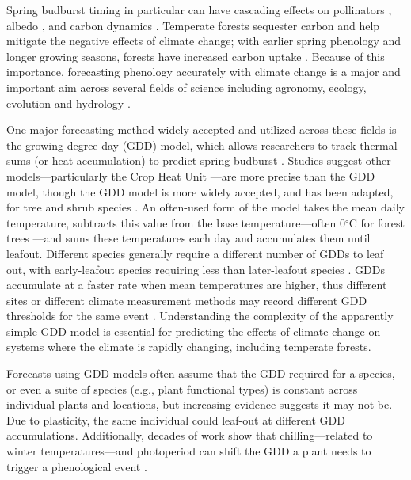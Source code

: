 \documentclass{article}\usepackage[]{graphicx}\usepackage[]{color}
\begin{document}
Spring budburst timing in particular can have cascading effects on pollinators \citep{Boggs2012, Pardee2017}, albedo \citep{Williamson2016}, and carbon dynamics \citep{Richardson2013}. Temperate forests sequester carbon and help mitigate the negative effects of climate change; with earlier spring phenology and longer growing seasons, forests have increased carbon uptake \citep{Keenan2014}. Because of this importance, forecasting phenology accurately with climate change is a major and important aim across several fields of science including agronomy, ecology, evolution and hydrology \citep{Moorcroft2001,Bolton2013,Yu2016,Taylor2020}. 
  
One major forecasting method widely accepted and utilized across these fields is the growing degree day (GDD) model, which allows researchers to track thermal sums (or heat accumulation) to predict spring budburst \citep{Schwartz2006,Vitasse2011,Cook2012,Phillimore2013,Crimmins2020}. Studies suggest other models---particularly the Crop Heat Unit \citep{Kumudini2014,Abendroth2019}---are more precise than the GDD model, though the GDD model is more widely accepted, and has been adapted, for tree and shrub species \citep{Yu2016,Klosterman2018,Montgomery2020}. An often-used form of the model takes the mean daily temperature, subtracts this value from the base temperature---often 0$^{\circ}$C for forest trees \citep[as estimates are proven to be more accurate,][]{Man2010}---and sums these temperatures each day and accumulates them until leafout. Different species generally require a different number of GDDs to leaf out, with early-leafout species requiring less than later-leafout species \citep{Fahey2016,Crimmins2020,Marquis2020}. GDDs accumulate at a faster rate when mean temperatures are higher, thus different sites or different climate measurement methods may record different GDD thresholds for the same event \citep{Bonhomme2000}. Understanding the complexity of the apparently simple GDD model is essential for predicting the effects of climate change on systems where the climate is rapidly changing, including temperate forests. 

Forecasts using GDD models often assume that the GDD required for a species, or even a suite of species (e.g., plant functional types) is constant across individual plants and locations, but increasing evidence suggests it may not be. Due to plasticity, the same individual could leaf-out at different GDD accumulations. Additionally, decades of work show that chilling---related to winter temperatures---and photoperiod can shift the GDD a plant needs to trigger a phenological event \citep{Basler2012,Chuine2010,Zohner2016}. 
\end{document}
